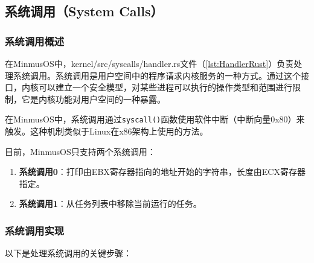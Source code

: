 \subsection{系统调用（System Calls）}

\subsubsection{系统调用概述}

在MinmusOS中，kernel/src/syscalls/handler.rs文件（\cref{lst:HandlerRust}）负责处理系统调用。系统调用是用户空间中的程序请求内核服务的一种方式。通过这个接口，内核可以建立一个安全模型，对某些进程可以执行的操作类型和范围进行限制，它是内核功能对用户空间的一种暴露。

在MinmusOS中，系统调用通过\texttt{syscall()}函数使用软件中断（中断向量0x80）来触发。这种机制类似于Linux在x86架构上使用的方法。

目前，MinmusOS只支持两个系统调用：

\begin{enumerate}
    \item \textbf{系统调用0}：打印由EBX寄存器指向的地址开始的字符串，长度由ECX寄存器指定。
    \item \textbf{系统调用1}：从任务列表中移除当前运行的任务。
\end{enumerate}

\subsubsection{系统调用实现}

以下是处理系统调用的关键步骤：

